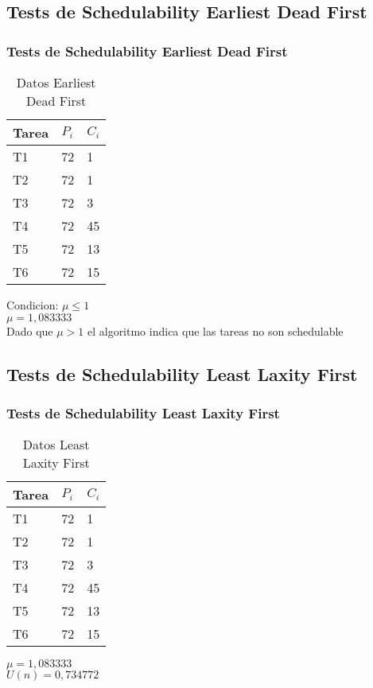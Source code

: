 \documentclass[xcolor=table]{beamer}
\begin{document}
\subsection{Tests de Schedulability  Earliest Dead First } 

\begin{frame} 
\frametitle{Tests de Schedulability  Earliest Dead First } 
\begin{table} 
\centering 
\begin{tabular}{|l|l|l|} 
\hline 
\cellcolor{lightgray}Tarea & \cellcolor{lightgray}$P_i$ & \cellcolor{lightgray}$C_i$ \\ \hline 
T1   & 72  &  1\\ \hline 
T2   & 72  &  1\\ \hline 
T3   & 72  &  3\\ \hline 
T4   & 72  &  45\\ \hline 
T5   & 72  &  13\\ \hline 
T6   & 72  &  15\\ \hline 
\end{tabular} 
\caption{Datos  Earliest Dead First } 
\end{table} 
Condicion: $\mu \leq 1$ \\ 
$\mu =  1,083333 $ \\ 
Dado que $\mu>1$ el algoritmo indica que las tareas no son schedulable \\ 
\end{frame} 

\subsection{Tests de Schedulability  Least Laxity First } 

\begin{frame} 
\frametitle{Tests de Schedulability  Least Laxity First } 
\begin{table} 
\centering 
\begin{tabular}{|l|l|l|} 
\hline 
\cellcolor{lightgray}Tarea & \cellcolor{lightgray}$P_i$ & \cellcolor{lightgray}$C_i$ \\ \hline 
T1   & 72  &  1\\ \hline 
T2   & 72  &  1\\ \hline 
T3   & 72  &  3\\ \hline 
T4   & 72  &  45\\ \hline 
T5   & 72  &  13\\ \hline 
T6   & 72  &  15\\ \hline 
\end{tabular} 
\caption{Datos  Least Laxity First } 
\end{table} 
$\mu =  1,083333 $ \\ 
$U(n) =  0,734772 $ \\ 
\end{frame} 
\end{document}
